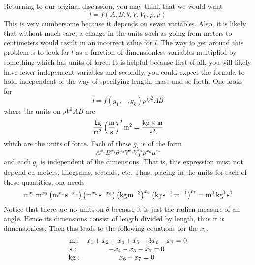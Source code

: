Returning to our original discussion, you may think that we would want 
\begin{equation*}
l=f\left( A,B,\theta ,V,V_{0},\rho ,\mu \right) 
\end{equation*}
This is very cumbersome because it depends on seven variables. Also,
it is likely that without much care, a change in the units such as
going from meters to centimeters would result in an incorrect value
for $l$. The way to get around this problem is to look for $l $ as a
function of dimensionless variables multiplied by something which has
units of force. It is helpful because first of all, you will likely
have fewer independent variables and secondly, you could expect the
formula to hold independent of the way of specifying length, mass and
so forth. One looks for
\begin{equation*}
l=f\left( g_{1},\cdots ,g_{k}\right) \rho V^{2}AB
\end{equation*}
where the units on $\rho V^{2}AB$ are 
\begin{equation*}
\frac{\kg}{\m^{3}}\left( \frac{\m}{\s }\right) ^{2}\m^{2}=\frac{\kg\times \m}{%
\s ^{2}}
\end{equation*}
which are the units of force. Each of these $g_{i}$ is of the form 
\begin{equation}
A^{x_{1}}B^{x_{2}}\theta ^{x_{3}}V^{x_{4}}V_{0}^{x_{5}}\rho ^{x_{6}}\mu
^{x_{7}}  \label{11julye1f}
\end{equation}
and each $g_{i}$ is independent of the dimensions. That is, this expression
must not depend on meters, kilograms, seconds, etc. Thus, placing in the
units for each of these quantities, one needs 
\begin{equation*}
\mathop{\textrm{m}}\nolimits^{x_{1}}\mathop{\textrm{m}}\nolimits^{x_{2}}\left( \mathop{\textrm{m}}\nolimits^{x_{4}}\mathop{\textrm{s}}\nolimits ^{-x_{4}}\right) \left( \mathop{\textrm{m}}\nolimits^{x_{5}}\mathop{\textrm{s}}\nolimits
^{-x_{5}}\right) \left( \mathop{\textrm{kg}}\nolimits\mathop{\textrm{m}}\nolimits^{-3}\right) ^{x_{6}}\left( \mathop{\textrm{kg}}\nolimits\mathop{\textrm{s}}\nolimits
^{-1}\mathop{\textrm{m}}\nolimits^{-1}\right) ^{x_{7}}=\mathop{\textrm{m}}\nolimits^{0}\mathop{\textrm{kg}}\nolimits^{0}\mathop{\textrm{s}}\nolimits ^{0}
\end{equation*}
Notice that there are no units on $\theta $ because it is just the radian
measure of an angle. Hence its dimensions consist of length divided by
length, thus it is dimensionless. Then this leads to the following equations
for the $x_{i}.$
\begin{equation*}
\begin{array}{cc}
\m: & x_{1}+x_{2}+x_{4}+x_{5}-3x_{6}-x_{7}=0 \\ 
\s :\  & -x_{4}-x_{5}-x_{7}=0 \\ 
\kg: & x_{6}+x_{7}=0%
\end{array}
\end{equation*}
